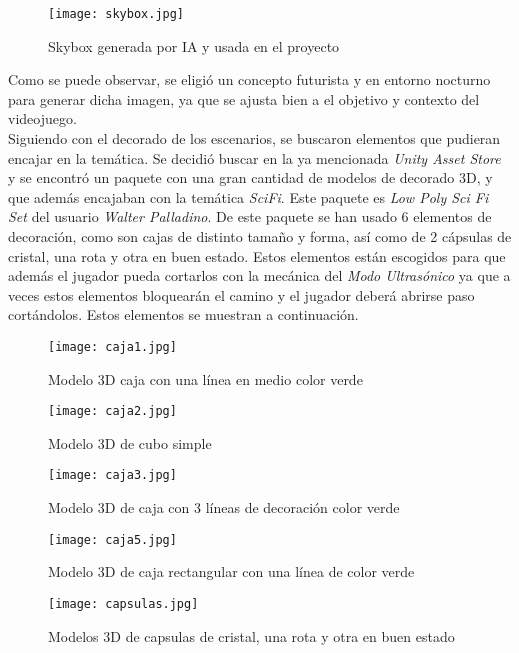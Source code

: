 \begin{figure}[H]
    \centering
    \texttt{[image: skybox.jpg]}
    \caption{Skybox generada por IA y usada en el proyecto}
\end{figure}

Como se puede observar, se eligió un concepto futurista y en entorno nocturno para generar dicha imagen, ya que se ajusta bien a el objetivo y contexto del videojuego.\\

Siguiendo con el decorado de los escenarios, se buscaron elementos que pudieran encajar en la temática. Se decidió buscar en la ya mencionada \textit{Unity Asset Store} y se encontró un paquete con una gran cantidad de modelos de decorado 3D, y que además encajaban con la temática \textit{SciFi}. Este paquete es \textit{Low Poly Sci Fi Set} del usuario \textit{Walter Palladino}. De este paquete se han usado 6 elementos de decoración, como son cajas de distinto tamaño y forma, así como de 2 cápsulas de cristal, una rota y otra en buen estado. Estos elementos están escogidos para que además el jugador pueda cortarlos con la mecánica del \textit{Modo Ultrasónico} ya que a veces estos elementos bloquearán el camino y el jugador deberá abrirse paso cortándolos.
Estos elementos se muestran a continuación.

\begin{figure}[H]
    \centering
    \texttt{[image: caja1.jpg]}
    \caption{Modelo 3D caja con una línea en medio color verde}
\end{figure}

\begin{figure}[H]
    \centering
    \texttt{[image: caja2.jpg]}
    \caption{Modelo 3D de cubo simple}
\end{figure}

\begin{figure}[H]
    \centering
    \texttt{[image: caja3.jpg]}
    \caption{Modelo 3D de caja con 3 líneas de decoración color verde}
\end{figure}

\begin{figure}[H]
    \centering
    \texttt{[image: caja5.jpg]}
    \caption{Modelo 3D de caja rectangular con una línea de color verde}
\end{figure}

\begin{figure}[H]
    \centering
    \texttt{[image: capsulas.jpg]}
    \caption{Modelos 3D de capsulas de cristal, una rota y otra en buen estado}
\end{figure}

